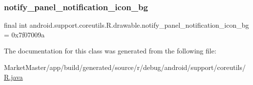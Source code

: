 \subsubsection{\texorpdfstring{notify\+\_\+panel\+\_\+notification\+\_\+icon\+\_\+bg}{notify\_panel\_notification\_icon\_bg}}
{\footnotesize\ttfamily final int android.\+support.\+coreutils.\+R.\+drawable.\+notify\+\_\+panel\+\_\+notification\+\_\+icon\+\_\+bg = 0x7f07009a\hspace{0.3cm}{\ttfamily [static]}}



The documentation for this class was generated from the following file\+:\begin{DoxyCompactItemize}
\item 
Market\+Master/app/build/generated/source/r/debug/android/support/coreutils/\mbox{\hyperlink{debug_2android_2support_2coreutils_2R_8java}{R.\+java}}\end{DoxyCompactItemize}

